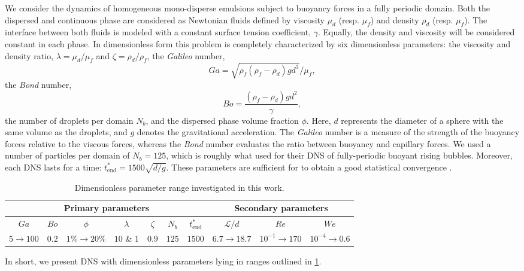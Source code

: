 We consider the dynamics of homogeneous mono-disperse emulsions subject to buoyancy forces in a fully periodic domain. 
Both the dispersed and continuous phase are considered as Newtonian fluids defined by viscosity $\mu_d$ (resp. $\mu_f$) and density $\rho_d$ (resp. $\mu_f$).
The interface between both fluids is modeled with a constant surface tension coefficient, $\gamma$. 
Equally, the density and viscosity will be considered constant in each phase.
In dimensionless form this problem is completely characterized by six dimensionless parameters:  the viscosity and density ratio, $\lambda = \mu_d / \mu_f$ and $\zeta = \rho_d / \rho_f$,  
the \textit{Galileo} number, 
\begin{equation*}
    Ga =\sqrt{\rho_f(\rho_f - \rho_d) g d^3} / \mu_f,
\end{equation*}
the \textit{Bond} number, 
\begin{equation*}
    Bo =\frac{(\rho_f - \rho_d) g d^2}{\gamma},
\end{equation*}
the number of droplets per domain $N_b$, and the dispersed phase volume fraction $\phi$. 
Here, $d$ represents the diameter of a sphere with the same volume as the droplets, and $g$ denotes the gravitational acceleration.
The \textit{Galileo} number is a measure of the strength of the buoyancy forces relative to the viscous forces, whereas the \textit{Bond} number evaluates the ratio between buoyancy and capillary forces. 
We used a number of particles per domain of $N_b = 125$, which is roughly what \citet{hidman2023assessing} used for their DNS of fully-periodic buoyant rising bubbles.
Moreover, each DNS lasts for a time: $t^*_\text{end} = 1500 \sqrt{d/g}$.
These parameters are sufficient for to obtain a good statistical convergence \citet{fintzi2024buoyancy}. 
\begin{table}[h!]
    \centering
    \caption{Dimensionless parameter range investigated in this work.}
    \begin{tabular}{|ccccccc|ccc|}\hline
        \multicolumn{7}{|c|}{Primary parameters}&\multicolumn{3}{|c|}{Secondary parameters}\\\hline\hline
        $Ga$&$Bo$&$\phi$&$\lambda$&$\zeta$&$N_b$&$t^*_\text{end}$&$\mathcal{L}/d$&$Re$&$We$\\ \hline
        $5\rightarrow 100$&$0.2$&$1\% \rightarrow 20\%$&$10$ \& $1$&$0.9$&$125$&$1500$&$6.7\to 18.7$&$10^{-1}\to 170$&$10^{-4}\to 0.6$\\ \hline
    \end{tabular}
    \label{tab:simulations}
\end{table}
In short, we present DNS with dimensionless parameters lying in ranges outlined in \ref{tab:simulations}.

